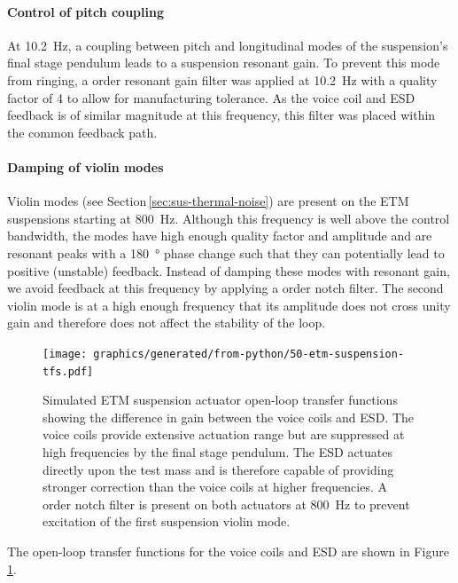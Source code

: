 \paragraph{Control of pitch coupling}
At \SI{10.2}{\hertz}, a coupling between pitch and longitudinal modes of the suspension's final stage pendulum leads to a suspension resonant gain. To prevent this mode from ringing, a  order resonant gain filter was applied at \SI{10.2}{\hertz} with a quality factor of \num{4} to allow for manufacturing tolerance. As the voice coil and \gls{ESD} feedback is of similar magnitude at this frequency, this filter was placed within the common feedback path.

\paragraph{Damping of violin modes}
Violin modes (see Section\,\ref{sec:sus-thermal-noise}) are present on the \gls{ETM} suspensions starting at \SI{800}{\hertz}. Although this frequency is well above the control bandwidth, the modes have high enough quality factor and amplitude and are resonant peaks with a \SI{180}{\degree} phase change such that they can potentially lead to positive (unstable) feedback. Instead of damping these modes with resonant gain, we avoid feedback at this frequency by applying a  order notch filter. The second violin mode is at a high enough frequency that its amplitude does not cross unity gain and therefore does not affect the stability of the loop.

\begin{figure}
  \texttt{[image: graphics/generated/from-python/50-etm-suspension-tfs.pdf]}
  \caption[Simulated end test mass suspension actuator open loop transfer functions]{\label{fig:suspension-crossover}Simulated \SSMEXPT{} ETM suspension actuator open-loop transfer functions showing the difference in gain between the voice coils and ESD. The voice coils provide extensive actuation range but are suppressed at high frequencies by the final stage pendulum. The \gls{ESD} actuates directly upon the test mass and is therefore capable of providing stronger correction than the voice coils at higher frequencies. A  order notch filter is present on both actuators at \SI{800}{\hertz} to prevent excitation of the first suspension violin mode.}
\end{figure}

The open-loop transfer functions for the voice coils and \gls{ESD} are shown in Figure\,\ref{fig:suspension-crossover}.


